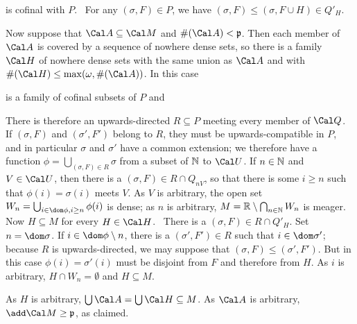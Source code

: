 {

\noindent is cofinal with $P$.   \Prf\ For any $(\sigma,F)\in P$, we
have $(\sigma,F)\le(\sigma,F\cup H)\in Q'_H$.\ \Qed

\medskip

 Now suppose that $\Cal A\subseteq\Cal M$ and
$\#(\Cal A)<\frak p$.   Then each member of $\Cal A$ is covered by a
sequence of nowhere dense sets, so there is a family $\Cal H$ of nowhere
dense sets with the same union as $\Cal A$ and with
$\#(\Cal H)\le\max(\omega,\#(\Cal A))$.   In this case


\noindent is a family of cofinal subsets of $P$ and


\noindent There is therefore an upwards-directed $R\subseteq P$ meeting
every member of $\Cal Q$.   If $(\sigma,F)$ and $(\sigma',F')$ belong to
$R$, they must be upwards-compatible in $P$, and in particular $\sigma$
and $\sigma'$ have a common extension;  we therefore have a function
$\phi=\bigcup_{(\sigma,F)\in R}\sigma$ from a subset of $\Bbb N$ to
$\Cal U$.   If $n\in\Bbb N$ and $V\in\Cal U$, then there is a
$(\sigma,F)\in R\cap Q_{nV}$, so that there is some $i\ge n$ such that
$\phi(i)=\sigma(i)$ meets $V$.   As $V$ is arbitrary, the open set
$W_n=\bigcup_{i\in\dom\phi,i\ge n}\phi(i)$ is dense;  as $n$ is arbitrary,
$M=\Bbb R\setminus\bigcap_{n\in\Bbb N}W_n$ is meager.   Now
$H\subseteq M$ for every $H\in\Cal H$.   \Prf\ There is a
$(\sigma,F)\in R\cap Q'_H$.   Set $n=\dom\sigma$.   If
$i\in\dom\phi\setminus n$, there is a $(\sigma',F')\in R$ such that
$i\in \dom\sigma'$;  because $R$ is upwards-directed, we may suppose
that $(\sigma,F)\le(\sigma',F')$.   But in this case
$\phi(i)=\sigma'(i)$ must be disjoint from $F$ and therefore from $H$.
As $i$ is arbitrary, $H\cap W_n=\emptyset$ and $H\subseteq M$.\ \Qed

As $H$ is arbitrary, $\bigcup\Cal A=\bigcup\Cal H\subseteq M$.   As
$\Cal A$ is arbitrary, $\add\Cal M\ge\frak p$, as claimed.
}%


